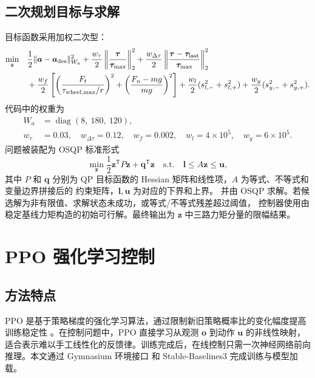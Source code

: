 \documentclass[UTF8,12pt,a4paper,fontset=none]{ctexart}
\begin{document}
\subsection{二次规划目标与求解}
目标函数采用加权二次型：
\begin{align}
\min_{\bm z}\quad
&\frac12\|\bm a-\bm a_{\rm des}\|_{W_a}^2
+\frac{w_\tau}{2}\left\|\frac{\bm\tau}{\bm\tau_{\max}}\right\|_2^2
+\frac{w_{\Delta\tau}}{2}\left\|\frac{\bm\tau-\bm\tau_{\rm last}}{\bm\tau_{\max}}\right\|_2^2\nonumber\\
&+\frac{w_f}{2}\left[
\left(\frac{F_t}{\tau_{{\rm wheel},\max}/r}\right)^2
+\left(\frac{F_n-mg}{mg}\right)^2
\right]
+\frac{w_l}{2}(s_{l,-}^2+s_{l,+}^2)
+\frac{w_y}{2}(s_{y,-}^2+s_{y,+}^2).
\end{align}
代码中的权重为
\begin{align}
W_a&=\operatorname{diag}(8,\ 180,\ 120),\\
w_\tau&=0.03,\quad
w_{\Delta\tau}=0.12,\quad
w_f=0.002,\quad
w_l=4\times10^5,\quad
w_y=6\times10^5.
\end{align}
问题被装配为 OSQP 标准形式
\begin{equation}
\min_{\bm z}\frac12\bm z^{\mathsf T}P\bm z+\bm q^{\mathsf T}\bm z
\quad\mathrm{s.t.}\quad
\bm l\le A\bm z\le\bm u,
\end{equation}
其中 $P$ 和 $\bm q$ 分别为 QP 目标函数的 Hessian 矩阵和线性项，$A$ 为等式、不等式和变量边界拼接后的
约束矩阵，$\bm l,\bm u$ 为对应的下界和上界。
并由 OSQP 求解\cite{Stellato2020OSQP}。若候选解为非有限值、求解状态未成功，或等式/不等式残差超过阈值，
控制器使用由稳定基线力矩构造的初始可行解。最终输出为 $\bm z$ 中三路力矩分量的限幅结果。

\section{PPO 强化学习控制}

\subsection{方法特点}
PPO 是基于策略梯度的强化学习算法，通过限制新旧策略概率比的变化幅度提高训练稳定性
\cite{Schulman2017PPO}。在控制问题中，PPO 直接学习从观测 $\bm o$ 到动作 $\bm u$ 的非线性映射，
适合表示难以手工线性化的反馈律。训练完成后，在线控制只需一次神经网络前向推理。本文通过 Gymnasium 环境接口
和 Stable-Baselines3 完成训练与模型加载\cite{Towers2024Gymnasium,Raffin2021SB3}。
\end{document}
